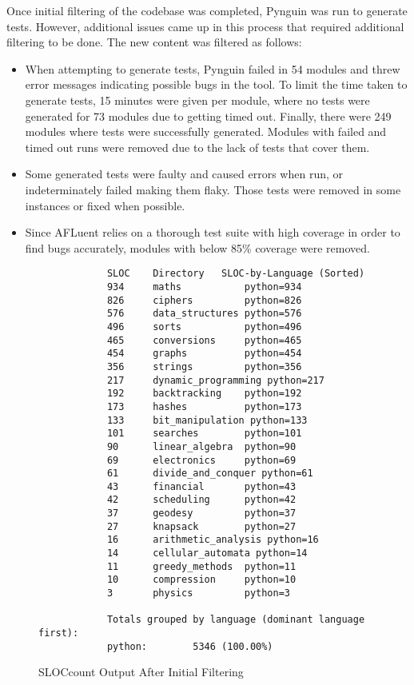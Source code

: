 Once initial filtering of the codebase was completed, Pynguin was run to
generate tests. However, additional issues came up in this process that required
additional filtering to be done. The new content was filtered as follows:
\begin{itemize}
    \item When attempting to generate tests,
    Pynguin failed in 54 modules and threw error messages indicating possible
    bugs in the tool. To limit the time taken to generate tests, 15 minutes were
    given per module, where no tests were generated for 73 modules due to
    getting timed out. Finally, there were 249 modules where tests were
    successfully generated. Modules with failed and timed out runs were removed
    due to the lack of tests that cover them.
    \item Some generated tests were faulty and caused errors when run, or
    indeterminately failed making them flaky. Those tests were removed in some
    instances or fixed when possible.
    \item Since AFLuent relies on a thorough test suite with high coverage in
    order to find bugs accurately, modules with below 85\% coverage were removed.
\end{itemize}

\begin{figure}[!htb]
	\begin{center}
		\begin{lstlisting}
            SLOC	Directory	SLOC-by-Language (Sorted)
            934     maths           python=934
            826     ciphers         python=826
            576     data_structures python=576
            496     sorts           python=496
            465     conversions     python=465
            454     graphs          python=454
            356     strings         python=356
            217     dynamic_programming python=217
            192     backtracking    python=192
            173     hashes          python=173
            133     bit_manipulation python=133
            101     searches        python=101
            90      linear_algebra  python=90
            69      electronics     python=69
            61      divide_and_conquer python=61
            43      financial       python=43
            42      scheduling      python=42
            37      geodesy         python=37
            27      knapsack        python=27
            16      arithmetic_analysis python=16
            14      cellular_automata python=14
            11      greedy_methods  python=11
            10      compression     python=10
            3       physics         python=3

            Totals grouped by language (dominant language first):
            python:        5346 (100.00%)

        \end{lstlisting}
		\caption{\label{fig:SLOCcount_phase2} SLOCcount Output After Initial Filtering}
	\end{center}
\end{figure}

